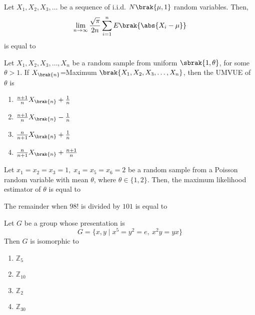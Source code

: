 \item Let $X_1,X_2,X_3,\ldots$ be a sequence of i.i.d. $N\brak{\mu,1}$ random variables. Then, $$\lim_{n \to \infty} \frac{\sqrt{\pi}}{2n}\sum_{i=1}^nE\brak{\abs{X_i-\mu}}$$ is equal to \underline{\hspace{2cm}}
\item Let $X_1,X_2,X_3,\ldots,X_n$ be a random sample from uniform $\sbrak{1,\theta}$, for some $\theta>1$. If $X_{\brak{n}}$=Maximum $\brak{X_1,X_2,X_3,\ldots,X_n}$, then the UMVUE of $\theta$ is
\begin{enumerate}
    \item $\frac{n+1}{n}X_{\brak{n}}+\frac{1}{n}$
    \item $\frac{n+1}{n}X_{\brak{n}}-\frac{1}{n}$
    \item $\frac{n}{n+1}X_{\brak{n}}+\frac{1}{n}$
    \item $\frac{n}{n+1}X_{\brak{n}}+\frac{n+1}{n}$
\end{enumerate}
\item Let $x_1=x_2=x_3=1,\;x_4=x_5=x_6=2$ be a random sample from a Poisson random variable with mean $\theta$, where $\theta \in \{1,2\}$. Then, the maximum likelihood estimator of $\theta$ is equal to \underline{\hspace{2cm}}
\item The remainder when $98!$ is divided by $101$ is equal to \underline{\hspace{2cm}}
\item Let $G$ be a group whose presentation is $$G=\{x,y\;|\;x^5=y^2=e,\:x^2y=yx\}$$ Then $G$ is isomorphic to
\begin{enumerate}
    \item $\mathbb{Z}_5$
    \item $\mathbb{Z}_{10}$
    \item $\mathbb{Z}_2$
    \item $\mathbb{Z}_{30}$
\end{enumerate}


